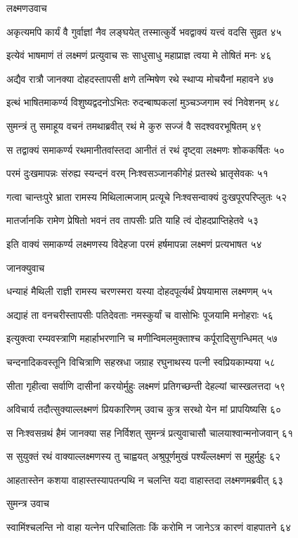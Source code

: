 लक्ष्मणउवाच

अकृत्यमपि कार्यं वै गुर्वाज्ञां नैव लङ्घयेत्
तस्मात्कुर्वे भवद्वाक्यं यत्त्वं वदसि सुव्रत ४५

इत्येवं भाषमाणं तं लक्ष्मणं प्रत्युवाच सः
साधुसाधु महाप्राज्ञ त्वया मे तोषितं मनः ४६

अद्यैव रात्रौ जानक्या दोहदस्तापसी क्षणे
तन्मिषेण रथे स्थाप्य मोचयैनां महावने ४७

इत्थं भाषितमाकर्ण्य विशुष्यद्वदनोऽभितः
रुदन्बाष्पकलां मुञ्चञ्जगाम स्वं निवेशनम् ४८

सुमन्त्रं तु समाहूय वचनं तमथाब्रवीत्
रथं मे कुरु सज्जं वै सदश्ववरभूषितम् ४९

स तद्वाक्यं समाकर्ण्य रथमानीतवांस्तदा
आनीतं तं रथं दृष्ट्वा लक्ष्मणः शोककर्षितः ५०

परमं दुःखमापन्नः संरुह्य स्यन्दनं वरम्
निःश्वसञ्जानकीगेहं प्रतस्थे भ्रातृसेवकः ५१

गत्वा चान्तःपुरे भ्राता रामस्य मिथिलात्मजाम्
प्रत्यूचे निःश्वसन्वाक्यं दुःखपूरपरिप्लुतः ५२

मातर्जानकि रामेण प्रेषितो भवनं तव
तापसीः प्रति याहि त्वं दोहदप्राप्तिहेतवे ५३

इति वाक्यं समाकर्ण्य लक्ष्मणस्य विदेहजा
परमं हर्षमापन्ना लक्ष्मणं प्रत्यभाषत ५४

जानक्युवाच

धन्याहं मैथिली राज्ञी रामस्य चरणस्मरा
यस्या दोहदपूर्त्यर्थं प्रेषयामास लक्ष्मणम् ५५

अद्याहं ता वनचरीस्तापसीः पतिदेवताः
नमस्कुर्यां च वासोभिः पूजयामि मनोहराः ५६

इत्युक्त्वा रम्यवस्त्राणि महार्हाभरणानि च
मणीन्विमलमुक्ताश्च कर्पूरादिसुगन्धिमत् ५७

चन्दनादिकवस्तूनि विचित्राणि सहस्रधा
जग्राह रघुनाथस्य पत्नी स्वप्रियकाम्यया ५८

सीता गृहीत्वा सर्वाणि दासीनां करयोर्मुहुः
लक्ष्मणं प्रतिगच्छन्ती देहल्यां चास्खलत्तदा ५९

अविचार्य तदौत्सुक्याल्लक्ष्मणं प्रियकारिणम्
उवाच कुत्र सरथो येन मां प्रापयिष्यसि ६०

स निःश्वसन्रथं हैमं जानक्या सह निर्विशत्
सुमन्त्रं प्रत्युवाचासौ चालयाश्वान्मनोजवान् ६१

स सुयुक्तं रथं वाक्याल्लक्ष्मणस्य तु चाह्वयत्
अश्रुपूर्णमुखं पश्यँल्लक्ष्मणं स मुहुर्मुहुः ६२

आहतास्तेन कशया वाहास्तस्यापतन्पथि
न चलन्ति यदा वाहास्तदा लक्ष्मणमब्रवीत् ६३

सुमन्त्र उवाच

स्वामिंश्चलन्ति नो वाहा यत्नेन परिचालिताः
किं करोमि न जानेऽत्र कारणं वाहपातने ६४

